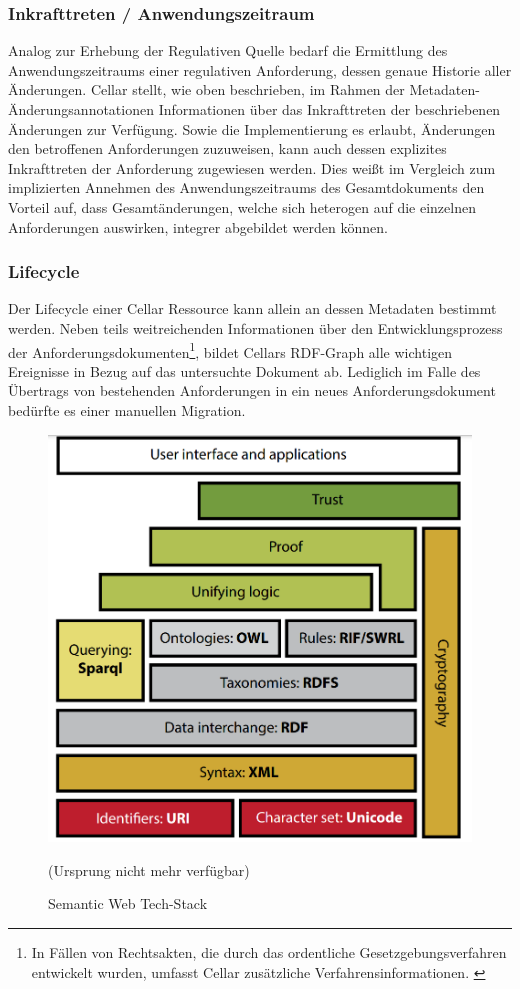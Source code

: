\subsubsection{Inkrafttreten / Anwendungszeitraum}

    Analog zur Erhebung der Regulativen Quelle bedarf die Ermittlung des Anwendungszeitraums einer regulativen Anforderung, dessen genaue Historie aller Änderungen.
    Cellar stellt, wie oben beschrieben, im Rahmen der Metadaten-Änderungsannotationen Informationen über das Inkrafttreten der beschriebenen Änderungen zur Verfügung.
    Sowie die Implementierung es erlaubt, Änderungen den betroffenen Anforderungen zuzuweisen, kann auch dessen explizites Inkrafttreten der Anforderung zugewiesen werden.
    Dies weißt im Vergleich zum implizierten Annehmen des Anwendungszeitraums des Gesamtdokuments den Vorteil auf, dass Gesamtänderungen, welche sich heterogen auf die einzelnen Anforderungen auswirken, integrer abgebildet werden können.
    
\subsubsection{Lifecycle}

    Der Lifecycle einer Cellar Ressource kann allein an dessen Metadaten bestimmt werden.
    Neben teils weitreichenden Informationen über den Entwicklungsprozess der Anforderungsdokumenten\footnote{In Fällen von Rechtsakten, die durch das ordentliche Gesetzgebungsverfahren entwickelt wurden, umfasst Cellar zusätzliche Verfahrensinformationen. \cite[vgl.][]{2004R0552}}, bildet Cellars RDF-Graph alle wichtigen Ereignisse in Bezug auf das untersuchte Dokument ab.  
    Lediglich im Falle des Übertrags von bestehenden Anforderungen in ein neues Anforderungsdokument bedürfte es einer manuellen Migration.

    \vspace{3.5cm}
    \begin{figure}[hb]
        \centering
        \includegraphics[width=.75\linewidth]{gfx/semantic_web_cake.png}
        \caption{Semantic Web Tech-Stack}
        \cite[10]{eu_cellar} (Ursprung nicht mehr verfügbar)
        \label{fig:semantic}
    \end{figure}
    